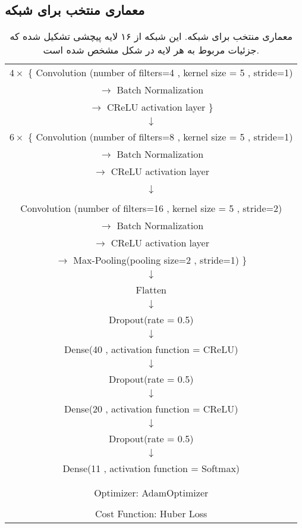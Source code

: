 \subsection{معماری منتخب برای شبکه}
\label{subsec:final_arch}
\begin{table}[h!]
	\caption{معماری منتخب برای شبکه. این شبکه از ۱۶ لایه پیچشی تشکیل شده که جزئیات مربوط به هر لایه در شکل مشخص شده است. }
	\label{Table:arch}
	\centering
	\begin{latin}
		\begin{tabular}{c}
			
			\hline
			
			$4 \times$ \Bigg\{ Convolution (number of filters=4 , kernel size = 5 , stride=1) \\
			$\rightarrow$ Batch Normalization \\
			$\rightarrow$ 
			CReLU activation layer \Bigg\} \\
			$\downarrow$ \\
			$6 \times$ \Bigg\{ Convolution (number of filters=8 , kernel size = 5 , stride=1) \\
			$\rightarrow$ Batch Normalization \\
			$\rightarrow$ CReLU activation layer \\
			\\
			$\downarrow$ \\
			\\
			Convolution (number of filters=16 , kernel size = 5 , stride=2) \\
			$\rightarrow$ Batch Normalization \\
			$\rightarrow$ CReLU activation layer  \\
			$\rightarrow$ Max-Pooling(pooling size=2 , stride=1) \Bigg\} \\ 
			$\downarrow$ \\
			Flatten \\
			$\downarrow$ \\
			Dropout(rate = 0.5) \\
			$\downarrow$ \\
			Dense(40 , activation function = CReLU) \\
			$\downarrow$ \\
			Dropout(rate = 0.5) \\
			$\downarrow$ \\
			Dense(20 , activation function = CReLU) \\
			$\downarrow$ \\
			Dropout(rate = 0.5) \\
			$\downarrow$ \\
			Dense(11 , activation function = Softmax) \\
			\\
			\hline
			\\
			Optimizer: AdamOptimizer \\
			\\
			Cost Function: Huber Loss
			
			
		\end{tabular}
	\end{latin}	
\end{table}
